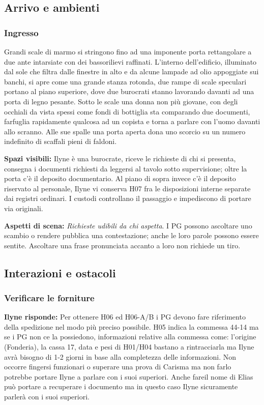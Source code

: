 \documentclass[11pt,a4paper]{article}
\newcommand{\aspect}[1]{\textit{\textcolor{blood}{#1}}}
\begin{document}
\subsection{Arrivo e ambienti}
\subsubsection{Ingresso}
\begin{readaloud}
Grandi scale di marmo si stringono fino ad una imponente porta rettangolare a due ante intarsiate con dei bassorilievi raffinati. L'interno dell'edificio, illuminato dal sole che filtra dalle finestre in alto e da alcune lampade ad olio appoggiate sui banchi, si apre come una grande stanza rotonda, due rampe di scale speculari portano al piano superiore, dove due burocrati stanno lavorando davanti ad una porta di legno pesante. Sotto le scale una donna non più giovane, con degli occhiali da vista spessi come fondi di bottiglia sta comparando due documenti, farfuglia rapidamente qualcosa ad un copista e torna a parlare con l'uomo davanti allo scranno. Alle sue spalle una porta aperta dona uno scorcio su un numero indefinito di scaffali pieni di faldoni.
\end{readaloud}

\textbf{Spazi visibili:} Ilyne è una burocrate, riceve le richieste di chi si presenta, consegna i documenti richiesti da leggersi al tavolo sotto supervisione; oltre la porta c'è il deposito documentario. Al piano di sopra invece c'è il deposito riservato al personale, Ilyne vi conserva H07 fra le disposizioni interne separate dai registri ordinari. I custodi controllano il passaggio e impediscono di portare via originali.

\textbf{Aspetti di scena:} \aspect{Richieste udibili da chi aspetta}. I PG possono ascoltare uno scambio o rendere pubblica una contestazione; anche le loro parole possono essere sentite. Ascoltare una frase pronunciata accanto a loro non richiede un tiro.

\subsection{Interazioni e ostacoli}
\subsubsection{Verificare le forniture}
\textbf{Ilyne risponde:} Per ottenere H06 ed H06-A/B i PG devono fare riferimento della spedizione nel modo più preciso possibile. H05 indica la commessa 44-14 ma se i PG non ce la possiedono, informazioni relative alla commessa come: l'origine (Fonderia), la cassa 17, data e pesi di H01/H04 bastano a rintracciarla ma Ilyne avrà bisogno di 1-2 giorni in base alla completezza delle informazioni. Non occorre fingersi funzionari o superare una prova di Carisma ma non farlo potrebbe portare Ilyne a parlare con i suoi superiori. Anche fareil nome di Elias può portare a recuperare i documento ma in questo caso Ilyne sicuramente parlerà con i suoi superiori.
\end{document}
